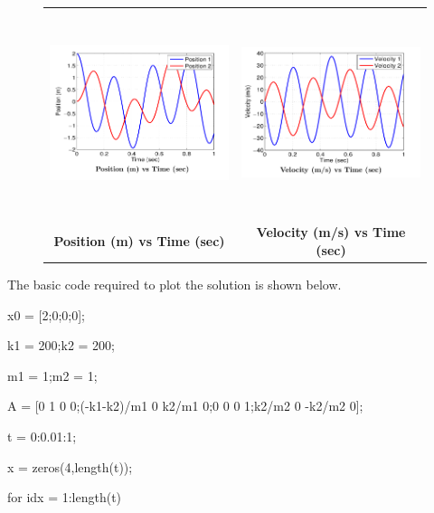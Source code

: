 \begin{enumerate}
   \begin{figure}[htb]
     \begin{center}
       \begin{tabular}{cc}
         \includegraphics[height=60mm,width=90mm]{Graphics/SpringMassPosition}
         &
         \includegraphics[height=60mm,width=90mm]{Graphics/SpringMassVelocity} \\
                         {\bf Position (m) vs Time (sec)}
                         &
                         {\bf Velocity (m/s) vs Time (sec)}
       \end{tabular}
     \end{center}
   \end{figure}

   The basic code required to plot the solution is shown below.

   \begin{framed}
     x0 = [2;0;0;0];

     k1 = 200;k2 = 200;

     m1 = 1;m2 = 1; 

     A = [0 1 0 0;(-k1-k2)/m1 0 k2/m1 0;0 0 0 1;k2/m2 0 -k2/m2 0]; 

     t = 0:0.01:1; 

     x = zeros(4,length(t)); 

     for idx = 1:length(t) 


\end{framed}
\end{enumerate}
